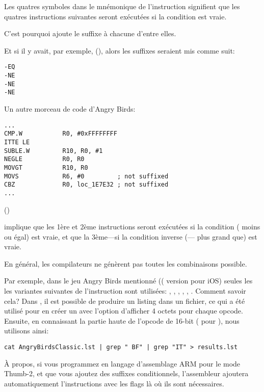 Les quatres symboles  dans le mnémonique de l'instruction signifient que les quatres
instructions suivantes seront exécutées si la condition est vraie.

C'est pourquoi \IDA ajoute le suffixe  à chacune d'entre elles.

Et si il y avait, par exemple,  (),
alors les suffixes seraient mis comme suit:

\begin{lstlisting}
-EQ
-NE
-NE
-NE
\end{lstlisting}

Un autre morceau de code d'Angry Birds:

\begin{lstlisting}[caption=Angry Birds Classic,style=customasmARM]
...
CMP.W           R0, #0xFFFFFFFF
ITTE LE
SUBLE.W         R10, R0, #1
NEGLE           R0, R0
MOVGT           R10, R0
MOVS            R6, #0         ; not suffixed
CBZ             R0, loc_1E7E32 ; not suffixed
...
\end{lstlisting}

 ()

implique que les 1ère et 2ème instructions seront exécutées si la condition 
( moins ou égal) est vraie, et que la 3ème---si la condition inverse
(--- plus grand que) est vraie.

En général, les compilateurs ne génèrent pas toutes les combinaisons possible.

Par exemple, dans le jeu Angry Birds mentionné (( version pour iOS)
seules les les variantes suivantes de l'instruction  sont utilisées:
, , , , , .
\myindex{\GrepUsage}
Comment savoir cela?
Dans \IDA, il est possible de produire un listing dans un fichier, ce qui a été utilisé
pour en créer un avec l'option d'afficher 4 octets pour chaque opcode.
Ensuite, en connaissant la partie haute de l'opcode de 16-bit ( pour ),
nous utilisons  ainsi:

\begin{lstlisting}
cat AngryBirdsClassic.lst | grep " BF" | grep "IT" > results.lst
\end{lstlisting}


À propos, si vous programmez en langage d'assemblage ARM pour le mode Thumb-2, et
que vous ajoutez des suffixes conditionnels, l'assembleur ajoutera automatiquement
l'instructions  avec les flags là où ils sont nécessaires.


